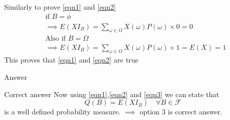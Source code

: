 \documentclass{beamer}
\begin{document}
\begin{frame}
\begin{block}{}
Similarly to prove \eqref{eqn1} and \eqref{eqn2}
\begin{align} \nonumber
&\text{if }B =\phi \\
&\implies E(XI_B)=\sum_{\omega \in \Omega}{ X(\omega)P(\omega)\times 0}=0\\ \nonumber
&\text{Also if }B=\Omega\\
&\implies E(XI_B)=\sum_{\omega \in \Omega}{ X(\omega) P(\omega)\times 1}=E(X)=1
\end{align}
This proves that \eqref{eqn1} and \eqref{eqn2} are true
\end{block}
\end{frame}
\begin{frame}{Answer}
\begin{block}{Correct answer}
Now using \eqref{eqn1},\eqref{eqn2} and \eqref{eqn3} we can state that \[Q(B)=E(XI_B)\quad\forall B \in \mathcal{F}\] is a well defined probability measure.
\(\implies\) option 3 is correct answer.  
\end{block}
\end{frame}
\end{document}
